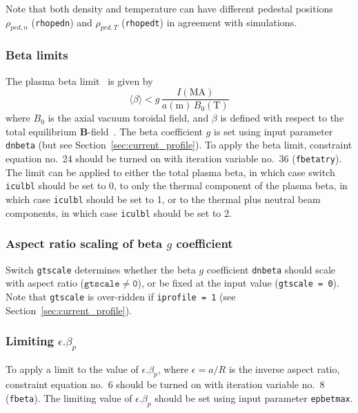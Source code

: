 \documentclass[11pt,a4paper]{report}
\begin{document}
Note that both density and temperature can have different pedestal positions
$\rho_{ped,n}$ (\texttt{rhopedn}) and $\rho_{ped,T}$ (\texttt{rhopedt}) in
agreement with simulations.

\subsubsection{Beta limits}

The plasma beta limit~\cite{IPDG,172} is given by
\begin{equation}
\langle \beta \rangle < g \, \frac{I(\mbox{MA})}{a(\mbox{m}) \, B_0(\mbox{T})}
\label{eqn:troyon}
\end{equation}
where $B_0$ is the axial vacuum toroidal field, and $\beta$ is defined with
respect to the total equilibrium $\mathbf{B}$-field~\cite{172}. The beta
coefficient $g$ is set using input parameter \texttt{dnbeta} (but see
Section~\ref{sec:current_profile}). To apply the beta limit, constraint
equation no.\ 24 should be turned on with iteration variable no.\ 36
(\texttt{fbetatry}). The limit can be applied to either the total plasma beta,
in which case switch \texttt{iculbl} should be set to 0, to only the thermal
component of the plasma beta, in which case \texttt{iculbl} should be set to
1, or to the thermal plus neutral beam components, in which case
\texttt{iculbl} should be set to 2.

\subsubsection*{Aspect ratio scaling of beta $g$ coefficient}

Switch \texttt{gtscale} determines whether the beta $g$ coefficient
\texttt{dnbeta} should scale with aspect ratio ($\mathtt{gtscale \not= 0}$),
or be fixed at the input value (\texttt{gtscale = 0}). Note that
\texttt{gtscale} is over-ridden if \texttt{iprofile = 1} (see
Section~\ref{sec:current_profile}).

\subsubsection*{Limiting $\epsilon.\beta_p$}

To apply a limit to the value of $\epsilon.\beta_p$, where $\epsilon = a/R$ is
the inverse aspect ratio, constraint equation no.\ 6 should be turned on with
iteration variable no.\ 8 (\texttt{fbeta}). The limiting value of
$\epsilon.\beta_p$ should be set using input parameter \texttt{epbetmax}.
\end{document}
